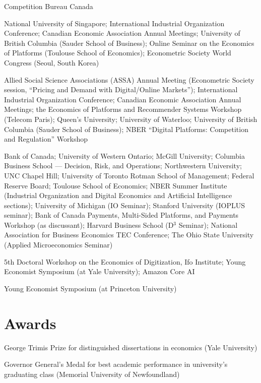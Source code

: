\documentclass[11pt]{article} %
\begin{document}
 Competition Bureau Canada

 National University of Singapore; 
	 International Industrial Organization Conference;
	 Canadian Economic Association Annual Meetings;
	 University of British Columbia (Sauder School of Business);
	 Online Seminar on the Economics of Platforms (Toulouse School of Economics);
	 Econometric Society World Congress (Seoul, South Korea)

 Allied Social Science Associations (ASSA) Annual Meeting
	(Econometric Society session, ``Pricing and Demand with Digital/Online Markets'');
	International Industrial Organization Conference;
	 Canadian Economic Association Annual Meetings;
		the Economics of Platforms and Recommender Systems Workshop (Telecom Paris);
		Queen's University; University of Waterloo;
            University of British Columbia (Sauder School of Business);
            NBER ``Digital Platforms: Competition and Regulation'' Workshop
	
 Bank of Canada; University of Western Ontario;
	McGill University; Columbia Business School --- Decision, Risk, and Operations;
	Northwestern University; UNC Chapel Hill; University of Toronto Rotman School
	of Management; Federal Reserve Board; Toulouse School of Economics;
	NBER Summer Institute (Industrial Organization and Digital Economics and Artificial
	Intelligence sections); University of Michigan (IO Seminar);
	Stanford University (IOPLUS seminar); Bank of Canada Payments, Multi-Sided Platforms, and Payments
	Workshop (as discussant); 
	Harvard Business School (D${}^3$ Seminar); 
	National Association for Business Economics TEC Conference;
	The Ohio State University (Applied Microeconomics Seminar)


 5th Doctoral Workshop on the Economics of Digitization, Ifo Institute; 
	Young Economist Symposium (at Yale University); Amazon Core AI


 Young Economist Symposium (at Princeton University)

\section*{Awards}

 George Trimis Prize for distinguished dissertations in economics (Yale University)

 Governor General's Medal for best academic performance in university's graduating class
	(Memorial University of Newfoundland)
\end{document}

